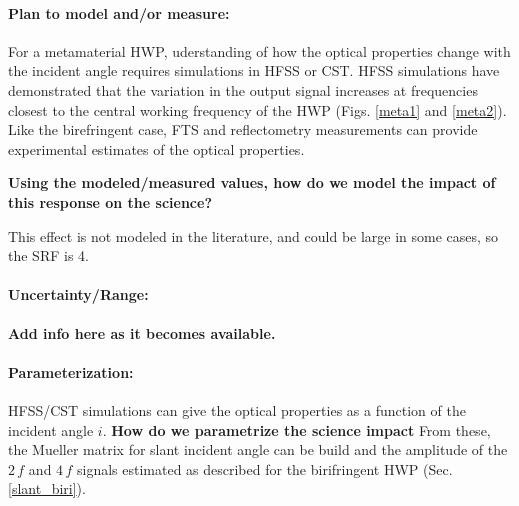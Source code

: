 \paragraph{Plan to model and/or measure:}
For a metamaterial HWP, uderstanding of how the optical properties change with the incident angle requires simulations in HFSS or CST. HFSS simulations have demonstrated that the variation in the output signal increases at frequencies closest to the central working frequency of the
HWP (Figs. \ref{meta1} and \ref{meta2}). 
Like the birefringent case, FTS and reflectometry measurements can provide experimental estimates of the optical properties.

\textbf{Using the modeled/measured values, how do we model the impact of this response on the science?}

This effect is not modeled in the literature, and could be large in some cases, so the SRF is 4.

\paragraph{Uncertainty/Range:}
\textbf{Add info here as it becomes available.}

\paragraph{Parameterization:}
HFSS/CST simulations can give the optical properties as a function of the incident angle $i$. \textbf{How do we parametrize the science impact} From these, the Mueller matrix for slant incident angle can be build and the amplitude of the $2\,f$ and $4\,f$ signals estimated as described for the birifringent HWP (Sec.\,\ref{slant_biri}). 
